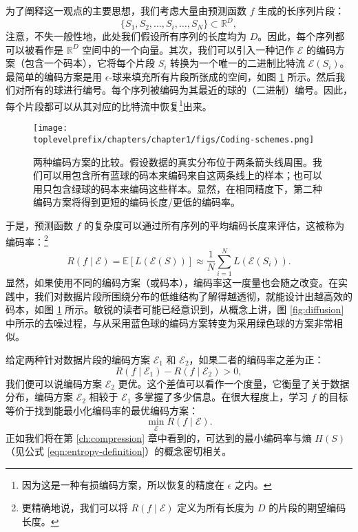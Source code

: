 \documentclass[../../book-main_zh.tex]{subfiles}
\begin{document}
为了阐释这一观点的主要思想，我们考虑大量由预测函数 $f$ 生成的长序列片段：
\begin{equation}
    \{S_1, S_2, \ldots, S_i, \ldots, S_N\} \subset \mathbb{R}^D,
\end{equation}
注意，不失一般性地，此处我们假设所有序列的长度均为 $D$。因此，每个序列都可以被看作是 $\mathbb{R}^D$ 空间中的一个向量。其次，我们可以引入一种记作 $\mathcal E$ 的编码方案（包含一个码本），它将每个片段 $S_i$ 转换为一个唯一的二进制比特流 $\mathcal{E}(S_i)$。最简单的编码方案是用 $\epsilon$-球来填充所有片段所张成的空间，如图 \ref{fig:coding-schemes} 所示。然后我们对所有的球进行编号。每个序列被编码为其最近的球的（二进制）编号。因此，每个片段都可以从其对应的比特流中恢复\footnote{因为这是一种有损编码方案，所以恢复的精度在 $\epsilon$ 之内。}出来。
\begin{figure}
    \centering
    \texttt{[image: \\toplevelprefix/chapters/chapter1/figs/Coding-schemes.png]}
    \caption{两种编码方案的比较。假设数据的真实分布位于两条箭头线周围。我们可以用包含所有蓝球的码本来编码来自这两条线上的样本；也可以用只包含绿球的码本来编码这些样本。显然，在相同精度下，第二种编码方案将得到更短的编码长度/更低的编码率。}
    \label{fig:coding-schemes}
\end{figure}

于是，预测函数 $f$ 的复杂度可以通过所有序列的平均编码长度来评估，这被称为编码率：\footnote{更精确地说，我们可以将 $R(f\mid \mathcal{E})$ 定义为所有长度为 $D$ 的片段的期望编码长度。}
\begin{equation}
   R(f \mid \mathcal E) = \mathbb{E}[L(\mathcal{E}(S))] \approx \frac{1}{N}\sum_{i=1}^N L(\mathcal{E}(S_i)). 
   \label{eqn:coding-rate}
\end{equation}
显然，如果使用不同的编码方案（或码本），编码率这一度量也会随之改变。在实践中，我们对数据片段所围绕分布的低维结构了解得越透彻，就能设计出越高效的码本，如图 \ref{fig:coding-schemes} 所示。敏锐的读者可能已经意识到，从概念上讲，图 \ref{fig:diffusion} 中所示的去噪过程，与从采用蓝色球的编码方案转变为采用绿色球的方案非常相似。


给定两种针对数据片段的编码方案 $\mathcal{E}_1$ 和 $\mathcal{E}_2$，如果二者的编码率之差为正：
\begin{equation}
   R(f \mid \mathcal E_1) -  R(f \mid \mathcal E_2) > 0, 
\end{equation}
我们便可以说编码方案 $\mathcal{E}_2$ 更优。这个差值可以看作一个度量，它衡量了关于数据分布，编码方案 $\mathcal{E}_2$ 相较于 $\mathcal{E}_1$ 多掌握了多少信息。在很大程度上，学习 $f$ 的目标等价于找到能最小化编码率的最优编码方案：
\begin{equation}
   \min_{\mathcal{E}} R(f \mid \mathcal E). 
\end{equation}
正如我们将在第 \ref{ch:compression} 章中看到的，可达到的最小编码率与熵 $H(S)$（见公式 \eqref{eqn:entropy-definition}）的概念密切相关。
\end{document}
